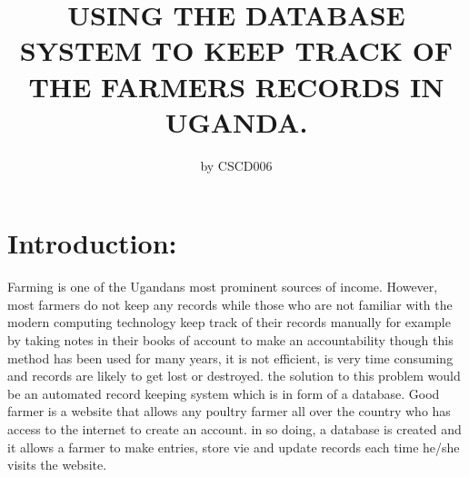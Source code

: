 \documentclass[10pt,letterpaper]{article}
\begin{document}
\title{USING THE DATABASE SYSTEM TO KEEP TRACK OF THE FARMERS RECORDS IN UGANDA.}
\author{by CSCD006  }
\maketitle
\section{Introduction:}
Farming is one of the Ugandans most prominent sources of income. However, most farmers do not keep any records while those who are not familiar with the modern computing technology keep track of their records manually for example by taking notes in their books of account to make an accountability though this method has been used for many years, it is not efficient, is very time consuming and records are likely to get lost or destroyed. the solution to this problem would be an automated record keeping system which is in form of a database.
Good farmer is a website that allows any poultry farmer all over the country who has access to the internet to create an account. in so doing, a database is created and it allows a farmer to make entries, store vie and update records each time he/she visits the website. 
\end{document}
